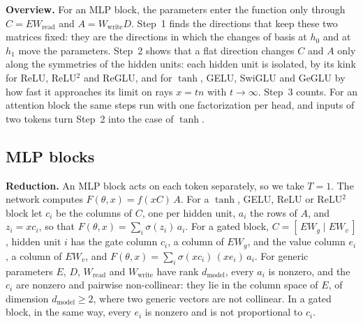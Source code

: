\documentclass[10pt]{article}
\theoremstyle{definition}
\theoremstyle{remark}
\newcommand{\Wread}{W_{\mathrm{read}}}
\newcommand{\Wwrite}{W_{\mathrm{write}}}
\newcommand{\dm}{d_{\mathrm{model}}}
\newcommand{\para}[1]{\smallskip\noindent\textbf{#1}\hspace{0.5em}}
\begin{document}
\para{Overview.} For an MLP block, the parameters enter the function only through $C = E\Wread$ and $A = \Wwrite D$. Step~1 finds the directions that keep these two matrices fixed: they are the directions in which the changes of basis at $h_0$ and at $h_1$ move the parameters. Step~2 shows that a flat direction changes $C$ and $A$ only along the symmetries of the hidden units: each hidden unit is isolated, by its kink for ReLU, ReLU$^2$ and ReGLU, and for $\tanh$, GELU, SwiGLU and GeGLU by how fast it approaches its limit on rays $x = tn$ with $t \to \infty$. Step~3 counts. For an attention block the same steps run with one factorization per head, and inputs of two tokens turn Step~2 into the case of $\tanh$.

\subsection*{MLP blocks}

\para{Reduction.} An MLP block acts on each token separately, so we take $T = 1$. The network computes $F(\theta, x) = f(xC)\,A$. For a $\tanh$, GELU, ReLU or ReLU$^2$ block let $c_i$ be the columns of $C$, one per hidden unit, $a_i$ the rows of $A$, and $z_i = xc_i$, so that $F(\theta, x) = \sum_i \sigma(z_i)\,a_i$. For a gated block, $C = [\,EW_g \mid EW_v\,]$, hidden unit $i$ has the gate column $c_i$, a column of $EW_g$, and the value column $e_i$, a column of $EW_v$, and $F(\theta, x) = \sum_i \sigma(xc_i)\,(xe_i)\,a_i$. For generic parameters $E$, $D$, $\Wread$ and $\Wwrite$ have rank $\dm$, every $a_i$ is nonzero, and the $c_i$ are nonzero and pairwise non-collinear: they lie in the column space of $E$, of dimension $\dm \ge 2$, where two generic vectors are not collinear. In a gated block, in the same way, every $e_i$ is nonzero and is not proportional to $c_i$.
\end{document}
